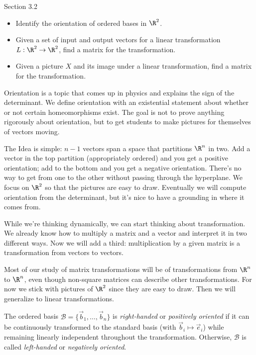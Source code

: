 \documentclass{problemset}
\begin{document}
\begin{lesson}
	\newpage

	Section 3.2

	\begin{itemize}
		\item Identify the orientation of ordered bases in $\R^2$.
		\item Given a set of input and output vectors for a 
			linear transformation $L:\R^2\to\R^2$, find 
			a matrix for the transformation.
		\item Given a picture $X$ and its image under a linear transformation,
			find a matrix for the transformation.
	\end{itemize}

	Orientation is a topic that comes up in physics and explains the sign
	of the determinant. We define orientation with an existential statement
	about whether or not certain homeomorphisms exist. The goal is not to
	prove anything rigorously about orientation, but to get students to
	make pictures for themselves of vectors moving.

	The Idea is simple: $n-1$ vectors span a space that partitions $\R^n$ in
	two. Add a vector in the top partition (appropriately ordered) and you get
	a positive orientation; add to the bottom and you get a negative orientation.
	There's no way to get from one to the other without passing through the
	hyperplane. We focus on $\R^2$ so that the pictures are easy to draw. Eventually
	we will compute orientation from the determinant, but it's nice to have
	a grounding in where it comes from.

	While we're thinking dynamically, we can start thinking about transformation.
	We already know how to multiply a matrix and a vector and interpret it in
	two different ways. Now we will add a third: multiplication by a given
	matrix is a transformation from vectors to vectors.

	Most of our study of matrix transformations will be of transformations from $\R^n$
	to $\R^n$, even though non-square matrices can describe other transformations.
	For now we stick with pictures of $\R^2$ since they are easy to draw. Then
	we will generalize to linear transformations.

	\newpage
\end{lesson}

	\begin{definition}
		The ordered basis $\mathcal B=\{\vec b_1,\ldots,\vec b_n\}$ is \emph{right-handed}
		or \emph{positively oriented} if it can be continuously transformed 
		to the standard basis (with
		$\vec b_i\mapsto \vec e_i$) while remaining linearly independent
		throughout the transformation. Otherwise, $\mathcal B$ is called
		\emph{left-handed} or \emph{negatively oriented}.
	\end{definition}
\end{document}
